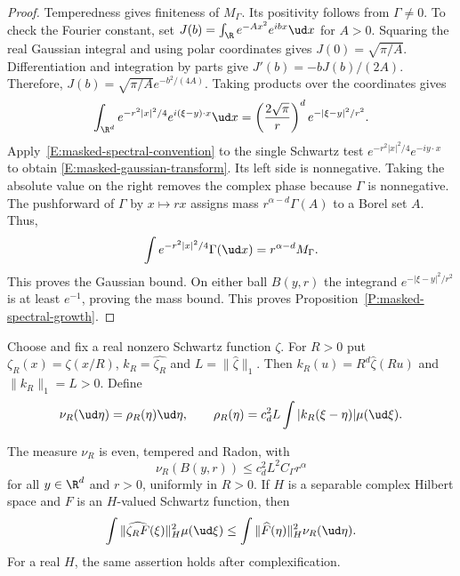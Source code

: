 \begin{proof}
  Temperedness gives finiteness of $M_\Gamma$. Its positivity follows from
  $\Gamma \ne 0$. To check the Fourier constant, set
  $J(b) = \int_\R e^{-Ax^2}e^{ibx}\ud x$ for $A > 0$. Squaring the real
  Gaussian integral and using polar coordinates gives
  $J(0) = \sqrt{\pi/A}$. Differentiation and integration by parts give
  $J'(b) = -bJ(b)/(2A)$. Therefore,
  $J(b) = \sqrt{\pi/A}e^{-b^2/(4A)}$. Taking products over the coordinates
  gives
  \[
    \int_{\R^d}e^{-r^2|x|^2/4}e^{i(\xi-y)\cdot x}\ud x
    = \left(\frac{2\sqrt{\pi}}r\right)^d e^{-|\xi-y|^2/r^2}.
  \]
  Apply~\eqref{E:masked-spectral-convention} to the single Schwartz test
  $e^{-r^2|x|^2/4}e^{-iy\cdot x}$ to obtain
  \eqref{E:masked-gaussian-transform}. Its left side is nonnegative.
  Taking the absolute value on the right removes the complex phase because
  $\Gamma$ is nonnegative. The pushforward of $\Gamma$ by $x \mapsto rx$
  assigns mass $r^{\alpha-d}\Gamma(A)$ to a Borel set $A$. Thus,
  \[
    \int e^{-r^2|x|^2/4}\Gamma(\ud x) = r^{\alpha-d}M_\Gamma.
  \]
  This proves the Gaussian bound. On either ball $B(y,r)$ the integrand
  $e^{-|\xi-y|^2/r^2}$ is at least $e^{-1}$, proving the mass bound.
  This proves Proposition~\ref{P:masked-spectral-growth}.
\end{proof}

Choose and fix a real nonzero Schwartz function $\zeta$. For $R > 0$ put
$\zeta_R(x) = \zeta(x/R)$, $k_R = \widehat{\zeta_R}$ and
$L = \|\widehat\zeta\|_1$. Then
$k_R(u) = R^d\widehat\zeta(Ru)$ and $\|k_R\|_1 = L > 0$. Define
\begin{equation}\label{E:masked-auxiliary-measure}
  \nu_R(\ud\eta) = \rho_R(\eta)\ud\eta,
  \qquad \rho_R(\eta) = c_d^2L\int |k_R(\xi-\eta)|\mu(\ud\xi).
\end{equation}

\begin{proposition}\label{P:masked-auxiliary-norm}
  The measure $\nu_R$ is even, tempered and Radon, with
  \begin{equation}\label{E:masked-auxiliary-growth}
    \nu_R(B(y,r)) \le c_d^2L^2C_\Gamma r^\alpha
  \end{equation}
  for all $y \in \R^d$ and $r > 0$, uniformly in $R > 0$.
  If $H$ is a separable complex Hilbert space and $F$ is an $H$-valued
  Schwartz function, then
  \begin{equation}\label{E:masked-hilbert-fourier}
    \int \|\widehat{\zeta_RF}(\xi)\|_H^2\mu(\ud\xi)
    \le \int \|\widehat F(\eta)\|_H^2\nu_R(\ud\eta).
  \end{equation}
  For a real $H$, the same assertion holds after complexification.
\end{proposition}

